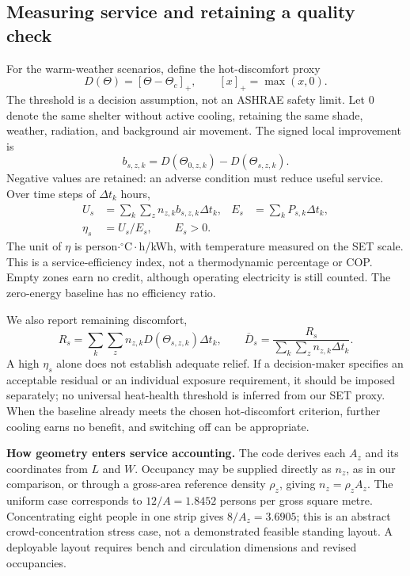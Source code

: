 \documentclass[12pt]{article}
\begin{document}
\subsection{Measuring service and retaining a quality check}

For the warm-weather scenarios, define the hot-discomfort proxy
\begin{equation}
 D(\Theta)=[\Theta-\Theta_c]_+,\qquad [x]_+=\max(x,0).
\end{equation}
The threshold is a decision assumption, not an ASHRAE safety limit. Let $0$ denote the same shelter without active cooling, retaining the same shade, weather, radiation, and background air movement. The signed local improvement is
\begin{equation}
 b_{s,z,k}=D(\Theta_{0,z,k})-D(\Theta_{s,z,k}).
\end{equation}
Negative values are retained: an adverse condition must reduce useful service. Over time steps of $\Delta t_k$ hours,
\begin{align}
 U_s&=\sum_k\sum_z n_{z,k}b_{s,z,k}\Delta t_k, &
 E_s&=\sum_k P_{s,k}\Delta t_k,\\
 \eta_s&=U_s/E_s,\qquad E_s>0.
\label{eq:bus-efficiency}
\end{align}
The unit of $\eta$ is person$\cdot{}^{\circ}\mathrm C\cdot$h/kWh, with temperature measured on the SET scale. This is a service-efficiency index, not a thermodynamic percentage or COP. Empty zones earn no credit, although operating electricity is still counted. The zero-energy baseline has no efficiency ratio.

We also report remaining discomfort,
\begin{equation}
 R_s=\sum_k\sum_z n_{z,k}D(\Theta_{s,z,k})\Delta t_k,
 \qquad \overline D_s=\frac{R_s}{\sum_k\sum_z n_{z,k}\Delta t_k}.
\label{eq:remaining}
\end{equation}
A high $\eta_s$ alone does not establish adequate relief. If a decision-maker specifies an acceptable residual or an individual exposure requirement, it should be imposed separately; no universal heat-health threshold is inferred from our SET proxy. When the baseline already meets the chosen hot-discomfort criterion, further cooling earns no benefit, and switching off can be appropriate.

\noindent\textbf{How geometry enters service accounting.} The code derives each $A_z$ and its coordinates from $L$ and $W$. Occupancy may be supplied directly as $n_z$, as in our comparison, or through a gross-area reference density $\rho_z$, giving $n_z=\rho_zA_z$. The uniform case corresponds to $12/A=1.8452$ persons per gross square metre. Concentrating eight people in one strip gives $8/A_z=3.6905$; this is an abstract crowd-concentration stress case, not a demonstrated feasible standing layout. A deployable layout requires bench and circulation dimensions and revised occupancies.
\end{document}
